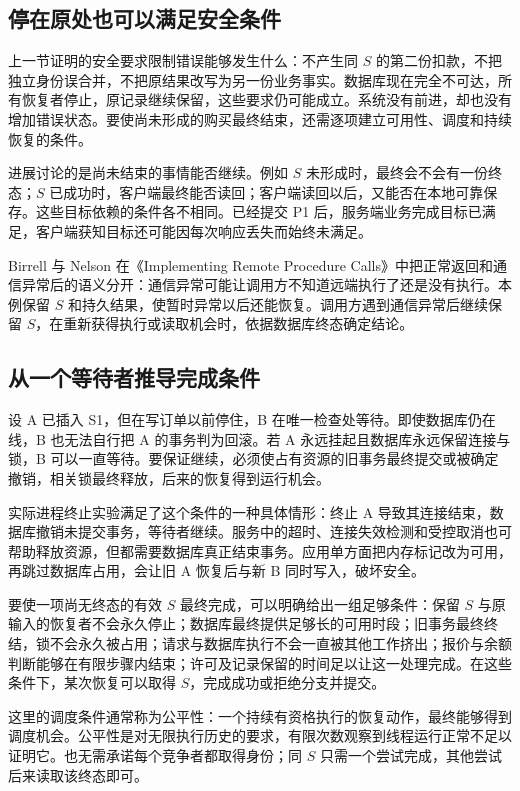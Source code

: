 \subsection*{停在原处也可以满足安全条件}

上一节证明的安全要求限制错误能够发生什么：不产生同 \(S\) 的第二份扣款，不把独立身份误合并，不把原结果改写为另一份业务事实。数据库现在完全不可达，所有恢复者停止，原记录继续保留，这些要求仍可能成立。系统没有前进，却也没有增加错误状态。要使尚未形成的购买最终结束，还需逐项建立可用性、调度和持续恢复的条件。

进展讨论的是尚未结束的事情能否继续。例如 \(S\) 未形成时，最终会不会有一份终态；\(S\) 已成功时，客户端最终能否读回；客户端读回以后，又能否在本地可靠保存。这些目标依赖的条件各不相同。已经提交 P1 后，服务端业务完成目标已满足，客户端获知目标还可能因每次响应丢失而始终未满足。

Birrell 与 Nelson 在《Implementing Remote Procedure Calls》中把正常返回和通信异常后的语义分开：通信异常可能让调用方不知道远端执行了还是没有执行\cite{rpc}。本例保留 \(S\) 和持久结果，使暂时异常以后还能恢复。调用方遇到通信异常后继续保留 \(S\)，在重新获得执行或读取机会时，依据数据库终态确定结论。

\subsection*{从一个等待者推导完成条件}

设 A 已插入 S1，但在写订单以前停住，B 在唯一检查处等待。即使数据库仍在线，B 也无法自行把 A 的事务判为回滚。若 A 永远挂起且数据库永远保留连接与锁，B 可以一直等待。要保证继续，必须使占有资源的旧事务最终提交或被确定撤销，相关锁最终释放，后来的恢复得到运行机会。

实际进程终止实验满足了这个条件的一种具体情形：终止 A 导致其连接结束，数据库撤销未提交事务，等待者继续。服务中的超时、连接失效检测和受控取消也可帮助释放资源，但都需要数据库真正结束事务。应用单方面把内存标记改为可用，再跳过数据库占用，会让旧 A 恢复后与新 B 同时写入，破坏安全。

要使一项尚无终态的有效 \(S\) 最终完成，可以明确给出一组足够条件：保留 \(S\) 与原输入的恢复者不会永久停止；数据库最终提供足够长的可用时段；旧事务最终终结，锁不会永久被占用；请求与数据库执行不会一直被其他工作挤出；报价与余额判断能够在有限步骤内结束；许可及记录保留的时间足以让这一处理完成。在这些条件下，某次恢复可以取得 \(S\)，完成成功或拒绝分支并提交。

这里的调度条件通常称为公平性：一个持续有资格执行的恢复动作，最终能够得到调度机会。公平性是对无限执行历史的要求，有限次数观察到线程运行正常不足以证明它。也无需承诺每个竞争者都取得身份；同 \(S\) 只需一个尝试完成，其他尝试后来读取该终态即可。


